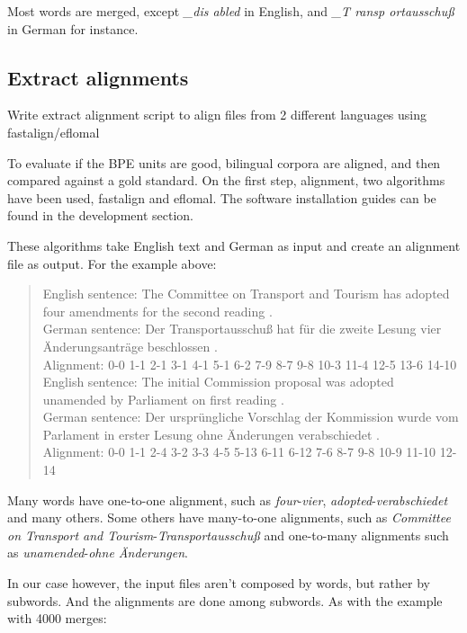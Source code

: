 Most words are merged, except \emph{\_dis abled} in English, and \emph{\_T ransp ortausschuß} in German for instance.

\subsection{Extract alignments}\label{subsec:extractalign}

Write extract alignment script to align files from 2 different languages using fastalign/eflomal

To evaluate if the BPE units are good, bilingual corpora are aligned, and then compared against a gold standard. On the first step, alignment, two algorithms have been used, fastalign and eflomal. The software installation guides can be found in the development section.

These algorithms take English text and German as input and create an alignment file as output. For the example above:

\begin{quote}
	English sentence: The Committee on Transport and Tourism has adopted four amendments for the second reading .\\
	German sentence: Der Transportausschuß hat für die zweite Lesung vier Änderungsanträge beschlossen .\\
	Alignment: 0-0 1-1 2-1 3-1 4-1 5-1 6-2 7-9 8-7 9-8 10-3 11-4 12-5 13-6 14-10\\

	English sentence: The initial Commission proposal was adopted unamended by Parliament on first reading .\\
	German sentence: Der ursprüngliche Vorschlag der Kommission wurde vom Parlament in erster Lesung ohne Änderungen verabschiedet .\\
	Alignment: 0-0 1-1 2-4 3-2 3-3 4-5 5-13 6-11 6-12 7-6 8-7 9-8 10-9 11-10 12-14
\end{quote}

Many words have one-to-one alignment, such as \emph{four}-\emph{vier}, \emph{adopted}-\emph{verabschiedet} and many others. Some others have many-to-one alignments, such as \emph{Committee on Transport and Tourism}-\emph{Transportausschuß} and one-to-many alignments such as \emph{unamended}-\emph{ohne Änderungen}.

In our case however, the input files aren't composed by words, but rather by subwords. And the alignments are done among subwords. As with the example with 4000 merges:

